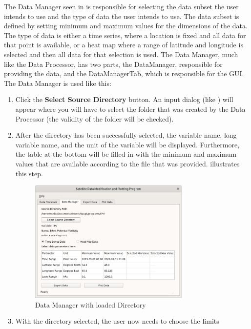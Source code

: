 \documentclass[../00_main.tex]{subfiles}
\begin{document}
The Data Manager seen in  is responsible for selecting the data 
subset the user intends to use and the type of data the user intends to use.
The data subset is defined by setting minimum and maximum values for the
dimensions of the data. The type of data is either a time series, where
a location is fixed and all data for that point is available, or a heat map
where a range of latitude and longitude is selected and then all data for that
selection is used. The Data Manager, much like the Data Processor, has two
parts, the DataManager, responsible for providing the data, and the
DataManagerTab, which is responsible for the GUI. The Data Manager is used like 
this:
\begin{enumerate}
    \item Click the \textbf{Select Source Directory} button. An input dialog
        (like ) will appear where you will have to select the 
        folder that was created by the Data Processor (the validity of the 
        folder will be checked).
    \item After the directory has been successfully selected, the variable
        name, long variable name, and the unit of the variable will be
        displayed. Furthermore, the table at the bottom will be filled in with
        the minimum and maximum values that are available according to the file
        that was provided.  illustrates this step.
        \begin{figure}[H]
            \center
            \includegraphics[width=0.75\textwidth]{../graphics/dm02}
            \caption{Data Manager with loaded Directory}
            \label{dm02}
        \end{figure}
    \item With the directory selected, the user now needs to choose the limits

\end{enumerate}
\end{document}
